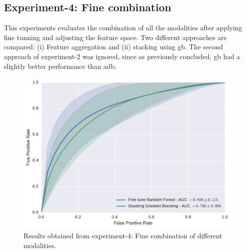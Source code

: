 \subsection{Experiment-4: Fine combination}\label{subsec:chp6:exp-res:Ex4}
This experiments evaluates the combination of all the modalities after applying fine tunning and adjusting the feature space. 
Two different approaches are compared: (i) Feature aggregation and (ii) stacking using \ac{gb}. 
The second approach of experiment-2 was ignored, since as previously concluded, \ac{gb} had a slightly better performance than \ac{adb}.

\begin{figure}
  \centering
  \includegraphics[width=0.7\linewidth]{6_pipeline/figures/exp-5/combine_all.pdf}
  \caption[Results obtained from experiment-4]{Results obtained from experiment-4: Fine combination of different modalities.}
  \label{fig:res-Ex4}
\end{figure}
